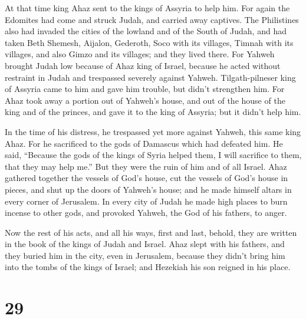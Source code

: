 At that time king Ahaz sent to the kings of Assyria to
help him.  For again the Edomites had come and struck
Judah, and carried away captives.  The Philistines also
had invaded the cities of the lowland and of the South of Judah, and had
taken Beth Shemesh, Aijalon, Gederoth, Soco with its villages, Timnah
with its villages, and also Gimzo and its villages; and they lived
there.  For Yahweh brought Judah low because of Ahaz king
of Israel, because he acted without restraint in Judah and trespassed
severely against Yahweh.  Tilgath-pilneser king of
Assyria came to him and gave him trouble, but didn't strengthen him.
 For Ahaz took away a portion out of Yahweh's house, and
out of the house of the king and of the princes, and gave it to the king
of Assyria; but it didn't help him.

 In the time of his distress, he trespassed yet more
against Yahweh, this same king Ahaz.  For he sacrificed
to the gods of Damascus which had defeated him. He said, ``Because the
gods of the kings of Syria helped them, I will sacrifice to them, that
they may help me.'' But they were the ruin of him and of all Israel.
 Ahaz gathered together the vessels of God's house, cut
the vessels of God's house in pieces, and shut up the doors of Yahweh's
house; and he made himself altars in every corner of Jerusalem.
 In every city of Judah he made high places to burn
incense to other gods, and provoked Yahweh, the God of his fathers, to
anger.

 Now the rest of his acts, and all his ways, first and
last, behold, they are written in the book of the kings of Judah and
Israel.  Ahaz slept with his fathers, and they buried him
in the city, even in Jerusalem, because they didn't bring him into the
tombs of the kings of Israel; and Hezekiah his son reigned in his place.

\hypertarget{section-28}{%
\section{29}\label{section-28}}

